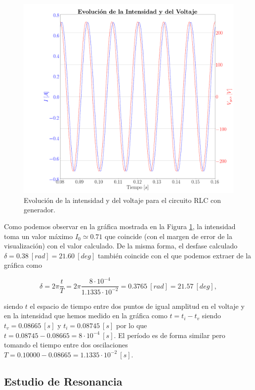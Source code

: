 \documentclass[journal]{IEEEtran}
\begin{document}
\begin{figure}[!htb]
    \centering
    \includegraphics[width=\linewidth,trim={120 0 0 40},clip]{congenintensidadvoltaje.png}
    \caption{Evolución de la intensidad y del voltaje para el circuito RLC con generador.}
    \label{fig:congenintensidadvoltaje}
\end{figure}

Como podemos observar en la gráfica mostrada en la Figura \ref{fig:congenintensidadvoltaje}, la intensidad toma un valor máximo $I_0 \simeq 0.71$ que coincide (con el margen de error de la visualización) con el valor calculado. De la misma forma, el desfase calculado $\delta = 0.38~[rad] = 21.60~[deg]$ también coincide con el que podemos extraer de la gráfica como

\begin{equation}
\delta = 2\pi \frac{t}{T} = 2\pi\frac{8\cdot 10^{-4}}{1.1335 \cdot 10^{-2}} = 0.3765~[rad] = 21.57~[deg],
\end{equation}

siendo $t$ el espacio de tiempo entre dos puntos de igual amplitud en el voltaje y en la intensidad que hemos medido en la gráfica como $t = t_i - t_v$ siendo $t_v = 0.08665~[s]$ y $t_i = 0.08745~[s]$ por lo que $t = 0.08745 - 0.08665 = 8\cdot 10^{-4}~[s]$. El período es de forma similar pero tomando el tiempo entre dos oscilaciones $T = 0.10000 - 0.08665 = 1.1335 \cdot 10^{-2}~[s]$.

\subsection{Estudio de Resonancia}
\label{subsec:estudioresonancia}
\end{document}
